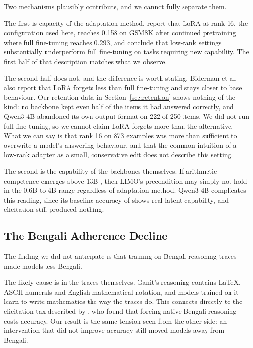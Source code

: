 Two mechanisms plausibly contribute, and we cannot fully separate them.

The first is capacity of the adaptation method. \textcite{biderman2024lora} %
report that LoRA at rank 16, the configuration used here, reaches 0.158 on
GSM8K after continued pretraining where full fine-tuning reaches 0.293, and
conclude that low-rank settings substantially underperform full fine-tuning on
tasks requiring new capability. The first half of that description matches what
we observe.

The second half does not, and the difference is worth stating. Biderman et al.
also report that LoRA forgets less than full fine-tuning and stays closer to
base behaviour. Our retention data in Section~\ref{sec:retention} shows nothing
of the kind: no backbone kept even half of the items it had answered correctly,
and Qwen3-4B abandoned its own output format on 222 of 250 items. We did not
run full fine-tuning, so we cannot claim LoRA forgets more than the alternative.
What we can say is that rank 16 on 873 examples was more than sufficient to
overwrite a model's answering behaviour, and that the common intuition of a
low-rank adapter as a small, conservative edit does not describe this setting.

The second is the capability of the backbones themselves. If arithmetic
competence emerges above 13B \parencite{wei2022emergent}, %
then LIMO's precondition may simply not hold in the 0.6B to 4B range regardless
of adaptation method. Qwen3-4B complicates this reading, since its baseline
accuracy of  shows real latent capability, and elicitation still
produced nothing.

\subsection{The Bengali Adherence Decline}

The finding we did not anticipate is that training on Bengali reasoning traces
made models less Bengali. 

The likely cause is in the traces themselves. Ganit's reasoning contains LaTeX,
ASCII numerals and English mathematical notation, and models trained on it learn
to write mathematics the way the traces do. This connects directly to the
elicitation tax described by \textcite{qi2025xreasoning}, who found that forcing
native Bengali reasoning costs accuracy. Our result is the same tension seen
from the other side: an intervention that did not improve accuracy still moved
models away from Bengali.


